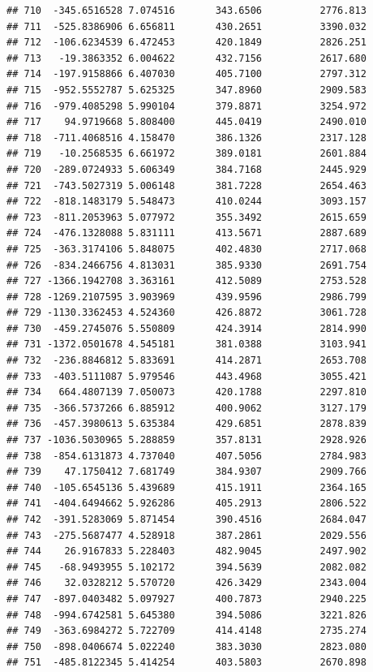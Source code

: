 \documentclass[
]{article}
\begin{document}
\begin{verbatim}
## 710  -345.6516528 7.074516       343.6506          2776.813
## 711  -525.8386906 6.656811       430.2651          3390.032
## 712  -106.6234539 6.472453       420.1849          2826.251
## 713   -19.3863352 6.004622       432.7156          2617.680
## 714  -197.9158866 6.407030       405.7100          2797.312
## 715  -952.5552787 5.625325       347.8960          2909.583
## 716  -979.4085298 5.990104       379.8871          3254.972
## 717    94.9719668 5.808400       445.0419          2490.010
## 718  -711.4068516 4.158470       386.1326          2317.128
## 719   -10.2568535 6.661972       389.0181          2601.884
## 720  -289.0724933 5.606349       384.7168          2445.929
## 721  -743.5027319 5.006148       381.7228          2654.463
## 722  -818.1483179 5.548473       410.0244          3093.157
## 723  -811.2053963 5.077972       355.3492          2615.659
## 724  -476.1328088 5.831111       413.5671          2887.689
## 725  -363.3174106 5.848075       402.4830          2717.068
## 726  -834.2466756 4.813031       385.9330          2691.754
## 727 -1366.1942708 3.363161       412.5089          2753.528
## 728 -1269.2107595 3.903969       439.9596          2986.799
## 729 -1130.3362453 4.524360       426.8872          3061.728
## 730  -459.2745076 5.550809       424.3914          2814.990
## 731 -1372.0501678 4.545181       381.0388          3103.941
## 732  -236.8846812 5.833691       414.2871          2653.708
## 733  -403.5111087 5.979546       443.4968          3055.421
## 734   664.4807139 7.050073       420.1788          2297.810
## 735  -366.5737266 6.885912       400.9062          3127.179
## 736  -457.3980613 5.635384       429.6851          2878.839
## 737 -1036.5030965 5.288859       357.8131          2928.926
## 738  -854.6131873 4.737040       407.5056          2784.983
## 739    47.1750412 7.681749       384.9307          2909.766
## 740  -105.6545136 5.439689       415.1911          2364.165
## 741  -404.6494662 5.926286       405.2913          2806.522
## 742  -391.5283069 5.871454       390.4516          2684.047
## 743  -275.5687477 4.528918       387.2861          2029.556
## 744    26.9167833 5.228403       482.9045          2497.902
## 745   -68.9493955 5.102172       394.5639          2082.082
## 746    32.0328212 5.570720       426.3429          2343.004
## 747  -897.0403482 5.097927       400.7873          2940.225
## 748  -994.6742581 5.645380       394.5086          3221.826
## 749  -363.6984272 5.722709       414.4148          2735.274
## 750  -898.0406674 5.022240       383.3030          2823.080
## 751  -485.8122345 5.414254       403.5803          2670.898

\end{verbatim}
\end{document}
